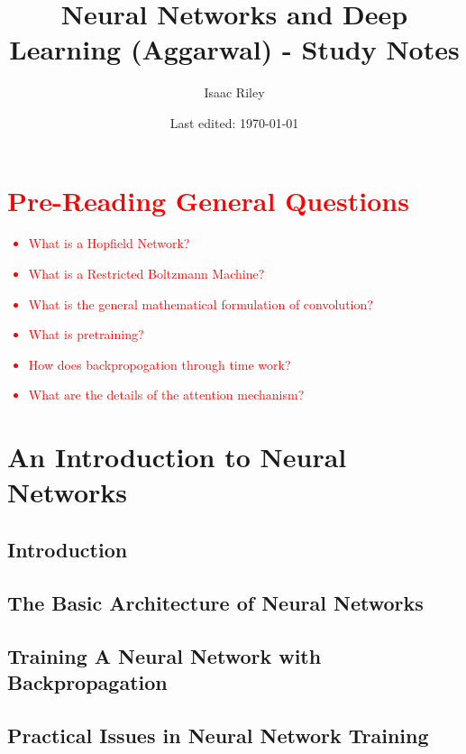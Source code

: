 \documentclass[a4paper]{article}
\title{Neural Networks and Deep Learning (Aggarwal) - Study Notes}
\author{Isaac Riley}
\date{Last edited: \today}
\newcommand{\followup}[1]{\textcolor{red}{ #1 }}
\begin{document}
\maketitle
\tableofcontents
\newpage


\section*{\followup{Pre-Reading General Questions}}
\followup{
\begin{itemize}
    \item What is a Hopfield Network?
    \item What is a Restricted Boltzmann Machine?
    \item What is the general mathematical formulation of convolution?
    \item What is pretraining?
    \item How does backpropogation through time work?
    \item What are the details of the attention mechanism?
\end{itemize}
}

\newpage
\section{An Introduction to Neural Networks}
\subsection{Introduction}

\subsection{The Basic Architecture of Neural Networks}

\subsection{Training A Neural Network with Backpropagation}

\subsection{Practical Issues in Neural Network Training}
\end{document}
